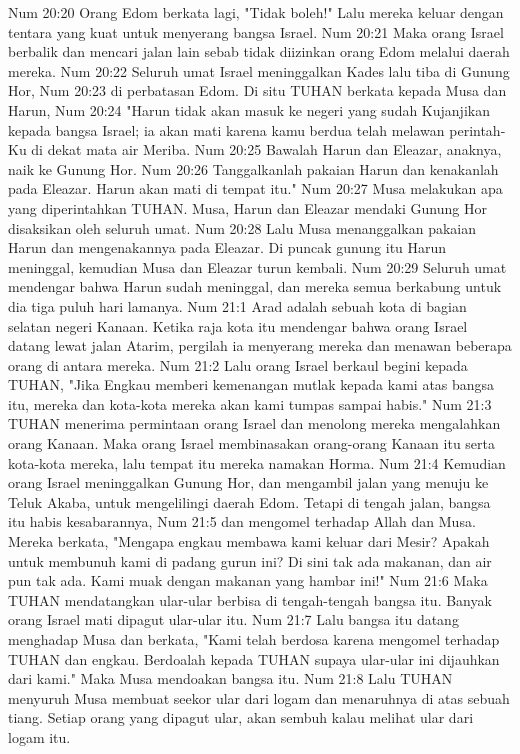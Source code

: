 Num 20:20  Orang Edom berkata lagi, "Tidak boleh!" Lalu mereka keluar dengan tentara yang kuat untuk menyerang bangsa Israel.
Num 20:21  Maka orang Israel berbalik dan mencari jalan lain sebab tidak diizinkan orang Edom melalui daerah mereka.
Num 20:22  Seluruh umat Israel meninggalkan Kades lalu tiba di Gunung Hor,
Num 20:23  di perbatasan Edom. Di situ TUHAN berkata kepada Musa dan Harun,
Num 20:24  "Harun tidak akan masuk ke negeri yang sudah Kujanjikan kepada bangsa Israel; ia akan mati karena kamu berdua telah melawan perintah-Ku di dekat mata air Meriba.
Num 20:25  Bawalah Harun dan Eleazar, anaknya, naik ke Gunung Hor.
Num 20:26  Tanggalkanlah pakaian Harun dan kenakanlah pada Eleazar. Harun akan mati di tempat itu."
Num 20:27  Musa melakukan apa yang diperintahkan TUHAN. Musa, Harun dan Eleazar mendaki Gunung Hor disaksikan oleh seluruh umat.
Num 20:28  Lalu Musa menanggalkan pakaian Harun dan mengenakannya pada Eleazar. Di puncak gunung itu Harun meninggal, kemudian Musa dan Eleazar turun kembali.
Num 20:29  Seluruh umat mendengar bahwa Harun sudah meninggal, dan mereka semua berkabung untuk dia tiga puluh hari lamanya.
Num 21:1  Arad adalah sebuah kota di bagian selatan negeri Kanaan. Ketika raja kota itu mendengar bahwa orang Israel datang lewat jalan Atarim, pergilah ia menyerang mereka dan menawan beberapa orang di antara mereka.
Num 21:2  Lalu orang Israel berkaul begini kepada TUHAN, "Jika Engkau memberi kemenangan mutlak kepada kami atas bangsa itu, mereka dan kota-kota mereka akan kami tumpas sampai habis."
Num 21:3  TUHAN menerima permintaan orang Israel dan menolong mereka mengalahkan orang Kanaan. Maka orang Israel membinasakan orang-orang Kanaan itu serta kota-kota mereka, lalu tempat itu mereka namakan Horma.
Num 21:4  Kemudian orang Israel meninggalkan Gunung Hor, dan mengambil jalan yang menuju ke Teluk Akaba, untuk mengelilingi daerah Edom. Tetapi di tengah jalan, bangsa itu habis kesabarannya,
Num 21:5  dan mengomel terhadap Allah dan Musa. Mereka berkata, "Mengapa engkau membawa kami keluar dari Mesir? Apakah untuk membunuh kami di padang gurun ini? Di sini tak ada makanan, dan air pun tak ada. Kami muak dengan makanan yang hambar ini!"
Num 21:6  Maka TUHAN mendatangkan ular-ular berbisa di tengah-tengah bangsa itu. Banyak orang Israel mati dipagut ular-ular itu.
Num 21:7  Lalu bangsa itu datang menghadap Musa dan berkata, "Kami telah berdosa karena mengomel terhadap TUHAN dan engkau. Berdoalah kepada TUHAN supaya ular-ular ini dijauhkan dari kami." Maka Musa mendoakan bangsa itu.
Num 21:8  Lalu TUHAN menyuruh Musa membuat seekor ular dari logam dan menaruhnya di atas sebuah tiang. Setiap orang yang dipagut ular, akan sembuh kalau melihat ular dari logam itu.
